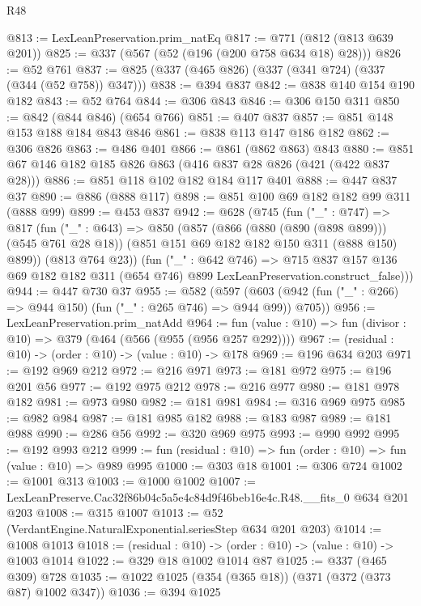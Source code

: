 \begin{lexlean}{R48}
\begin{coremodule}
@813 := LexLeanPreservation.prim_natEq
@817 := @771 (@812 (@813 @639 @201))
@825 := @337 (@567 (@52 (@196 (@200 @758 @634 @18) @28)))
@826 := @52 @761
@837 := @825 (@337 (@465 @826) (@337 (@341 @724) (@337 (@344 (@52 @758)) @347)))
@838 := @394 @837
@842 := @838 @140 @154 @190 @182
@843 := @52 @764
@844 := @306 @843
@846 := @306 @150 @311
@850 := @842 (@844 @846) (@654 @766)
@851 := @407 @837
@857 := @851 @148 @153 @188 @184 @843 @846
@861 := @838 @113 @147 @186 @182
@862 := @306 @826
@863 := @486 @401
@866 := @861 (@862 @863) @843
@880 := @851 @67 @146 @182 @185 @826 @863 (@416 @837 @28 @826 (@421 (@422 @837 @28)))
@886 := @851 @118 @102 @182 @184 @117 @401
@888 := @447 @837 @37
@890 := @886 (@888 @117)
@898 := @851 @100 @69 @182 @182 @99 @311 (@888 @99)
@899 := @453 @837
@942 := @628
    (@745
      (fun ("_" : @747) =>
      @817
        (fun ("_" : @643) =>
        @850
          (@857
            (@866 (@880 (@890 (@898 @899))) (@545 @761 @28 @18))
            (@851 @151 @69 @182 @182 @150 @311 (@888 @150) @899))
          (@813 @764 @23))
        (fun ("_" : @642 @746) =>
        @715
          @837
          @157
          @136
          @69
          @182
          @182
          @311
          (@654 @746)
          @899
          LexLeanPreservation.construct_false)))
@944 := @447 @730 @37
@955 := @582
    (@597 (@603 (@942 (fun ("_" : @266) => @944 @150) (fun ("_" : @265 @746) => @944 @99)) @705))
@956 := LexLeanPreservation.prim_natAdd
@964 := fun (value : @10) => fun (divisor : @10) => @379 (@464 (@566 (@955 (@956 @257 @292))))
@967 := (residual : @10) -> (order : @10) -> (value : @10) -> @178
@969 := @196 @634 @203
@971 := @192 @969 @212
@972 := @216 @971
@973 := @181 @972
@975 := @196 @201 @56
@977 := @192 @975 @212
@978 := @216 @977
@980 := @181 @978 @182
@981 := @973 @980
@982 := @181 @981
@984 := @316 @969 @975
@985 := @982 @984
@987 := @181 @985 @182
@988 := @183 @987
@989 := @181 @988
@990 := @286 @56
@992 := @320 @969 @975
@993 := @990 @992
@995 := @192 @993 @212
@999 := fun (residual : @10) => fun (order : @10) => fun (value : @10) => @989 @995
@1000 := @303 @18
@1001 := @306 @724
@1002 := @1001 @313
@1003 := @1000 @1002
@1007 := LexLeanPreserve.Cac32f86b04c5a5e4c84d9f46beb16e4c.R48.__fits_0 @634 @201 @203
@1008 := @315 @1007
@1013 := @52 (VerdantEngine.NaturalExponential.seriesStep @634 @201 @203)
@1014 := @1008 @1013
@1018 := (residual : @10) -> (order : @10) -> (value : @10) -> @1003 @1014
@1022 := @329 @18 @1002 @1014 @87
@1025 := @337 (@465 @309) @728
@1035 := @1022 @1025 (@354 (@365 @18)) (@371 (@372 (@373 @87) @1002 @347))
@1036 := @394 @1025

\end{coremodule}
\end{lexlean}
